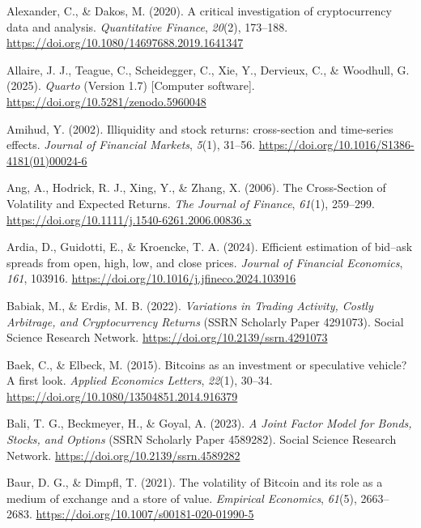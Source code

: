\documentclass[
  12pt,
  a4paper,
  openany]{scrbook}
\newlength{\cslhangindent}
\newenvironment{CSLReferences}[2] %
 {\begin{list}{}{%
  \setlength{\itemindent}{0pt}
  \setlength{\leftmargin}{0pt}
  \setlength{\parsep}{0pt}
  \ifodd #1
   \setlength{\leftmargin}{\cslhangindent}
   \setlength{\itemindent}{-1\cslhangindent}
  \fi
  \setlength{\itemsep}{#2\baselineskip}}}
 {\end{list}}
\begin{document}
\label{refs}
\begin{CSLReferences}{1}{0}
Alexander, C., \& Dakos, M. (2020). A critical investigation of
cryptocurrency data and analysis. \emph{Quantitative Finance},
\emph{20}(2), 173--188.
\url{https://doi.org/10.1080/14697688.2019.1641347}

Allaire, J. J., Teague, C., Scheidegger, C., Xie, Y., Dervieux, C., \&
Woodhull, G. (2025). \emph{{Quarto}} (Version 1.7) {[}Computer
software{]}. \url{https://doi.org/10.5281/zenodo.5960048}

Amihud, Y. (2002). Illiquidity and stock returns: cross-section and
time-series effects. \emph{Journal of Financial Markets}, \emph{5}(1),
31--56. \url{https://doi.org/10.1016/S1386-4181(01)00024-6}

Ang, A., Hodrick, R. J., Xing, Y., \& Zhang, X. (2006). The
Cross-Section of Volatility and Expected Returns. \emph{The Journal of
Finance}, \emph{61}(1), 259--299.
\url{https://doi.org/10.1111/j.1540-6261.2006.00836.x}

Ardia, D., Guidotti, E., \& Kroencke, T. A. (2024). Efficient estimation
of bid--ask spreads from open, high, low, and close prices.
\emph{Journal of Financial Economics}, \emph{161}, 103916.
\url{https://doi.org/10.1016/j.jfineco.2024.103916}

Babiak, M., \& Erdis, M. B. (2022). \emph{Variations in Trading
Activity, Costly Arbitrage, and Cryptocurrency Returns} (SSRN Scholarly
Paper 4291073). Social Science Research Network.
\url{https://doi.org/10.2139/ssrn.4291073}

Baek, C., \& Elbeck, M. (2015). Bitcoins as an investment or speculative
vehicle? A first look. \emph{Applied Economics Letters}, \emph{22}(1),
30--34. \url{https://doi.org/10.1080/13504851.2014.916379}

Bali, T. G., Beckmeyer, H., \& Goyal, A. (2023). \emph{A Joint Factor
Model for Bonds, Stocks, and Options} (SSRN Scholarly Paper 4589282).
Social Science Research Network.
\url{https://doi.org/10.2139/ssrn.4589282}

Baur, D. G., \& Dimpfl, T. (2021). The volatility of Bitcoin and its
role as a medium of exchange and a store of value. \emph{Empirical
Economics}, \emph{61}(5), 2663--2683.
\url{https://doi.org/10.1007/s00181-020-01990-5}


\end{CSLReferences}
\end{document}
